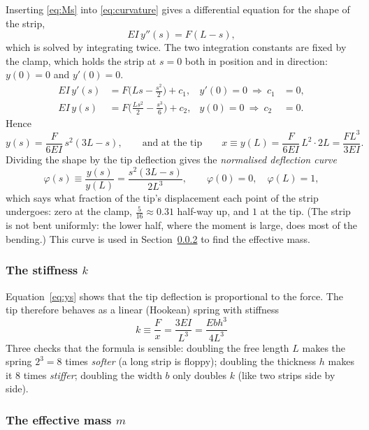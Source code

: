 \documentclass[11pt,a4paper]{article}
\begin{document}
Inserting \eqref{eq:Ms} into \eqref{eq:curvature} gives a differential equation for the shape of the strip,
\begin{equation}
EI\,y''(s)=F(L-s),
\end{equation}
which is solved by integrating twice. The two integration constants are fixed by the clamp, which holds the strip at $s=0$ both in position and in direction: $y(0)=0$ and $y'(0)=0$.
\begin{align}
EI\,y'(s)&=F\Big(Ls-\frac{s^2}{2}\Big)+c_1, & y'(0)=0\ \Rightarrow\ c_1&=0,\\
EI\,y(s)&=F\Big(\frac{Ls^2}{2}-\frac{s^3}{6}\Big)+c_2, & y(0)=0\ \Rightarrow\ c_2&=0 .
\end{align}
Hence
\begin{equation}
y(s)=\frac{F}{6EI}\,s^2(3L-s),\qquad\text{and at the tip}\qquad x\equiv y(L)=\frac{F}{6EI}\,L^2\cdot2L=\frac{FL^3}{3EI}.
\label{eq:ys}
\end{equation}
Dividing the shape by the tip deflection gives the \emph{normalised deflection curve}
\begin{equation}
\varphi(s)\equiv\frac{y(s)}{y(L)}=\frac{s^2(3L-s)}{2L^3},\qquad \varphi(0)=0,\quad \varphi(L)=1,
\label{eq:phi}
\end{equation}
which says what fraction of the tip's displacement each point of the strip undergoes: zero at the clamp, $\tfrac{5}{16}\approx0.31$ half-way up, and $1$ at the tip. (The strip is not bent uniformly: the lower half, where the moment is large, does most of the bending.) This curve is used in Section~\ref{sec:meff} to find the effective mass.

\subsubsection{The stiffness $k$}

Equation~\eqref{eq:ys} shows that the tip deflection is proportional to the force. The tip therefore behaves as a linear (Hookean) spring with stiffness
\begin{equation}
\boxed{\;k\equiv\frac{F}{x}=\frac{3EI}{L^3}=\frac{Ebh^3}{4L^3}\;}
\label{eq:k}
\end{equation}
Three checks that the formula is sensible: doubling the free length $L$ makes the spring $2^3=8$ times \emph{softer} (a long strip is floppy); doubling the thickness $h$ makes it $8$ times \emph{stiffer}; doubling the width $b$ only doubles $k$ (like two strips side by side).

\subsubsection{The effective mass $m$}\label{sec:meff}
\end{document}
